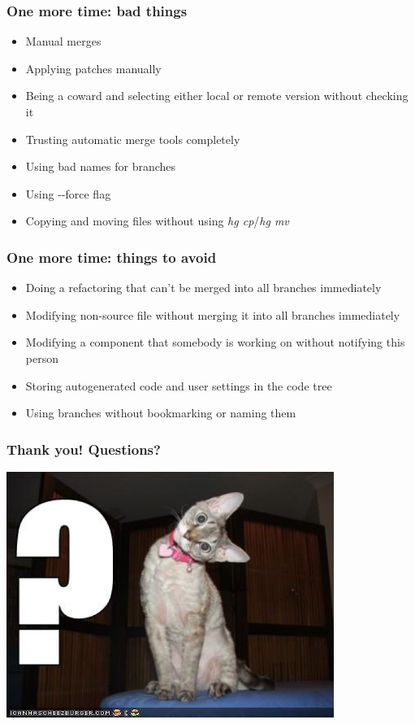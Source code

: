 \documentclass{beamer}
\begin{document}
\begin{frame}[fragile]
\frametitle{One more time: bad things}
\begin{itemize}
\item Manual merges
\item Applying patches manually
\item Being a coward and selecting either local or remote version without checking it
\item Trusting automatic merge tools completely
\item Using bad names for branches
\item Using \textrm{-}\textrm{-force} flag
\item Copying and moving files without using \textit{hg cp}/\textit{hg mv} 
\end{itemize}
\end{frame}

\begin{frame}
\frametitle{One more time: things to avoid}
\begin{itemize}
\item Doing a refactoring that can't be merged into all branches immediately
\item Modifying non-source file without merging it into all branches immediately
\item Modifying a component that somebody is working on without notifying this person 
\item Storing autogenerated code and user settings in the code tree
\item Using branches without bookmarking or naming them
\end{itemize}
\end{frame}


\begin{frame}
\frametitle{Thank you! Questions?}
\begin{center}
\includegraphics[width=0.8\textwidth]{img/cat}
\end{center}
\end{frame}
\end{document}
